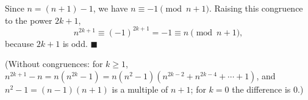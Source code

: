 Since $n=(n+1)-1$, we have $n\equiv-1\pmod{n+1}$. Raising this congruence to the power $2k+1$,
\[n^{2k+1}\equiv(-1)^{2k+1}=-1\equiv n\pmod{n+1},\]
because $2k+1$ is odd. $\blacksquare$

(Without congruences: for $k\ge1$, $n^{2k+1}-n=n\left(n^{2k}-1\right)=n\left(n^2-1\right)\left(n^{2k-2}+n^{2k-4}+\cdots+1\right)$, and $n^2-1=(n-1)(n+1)$ is a multiple of $n+1$; for $k=0$ the difference is $0$.)
